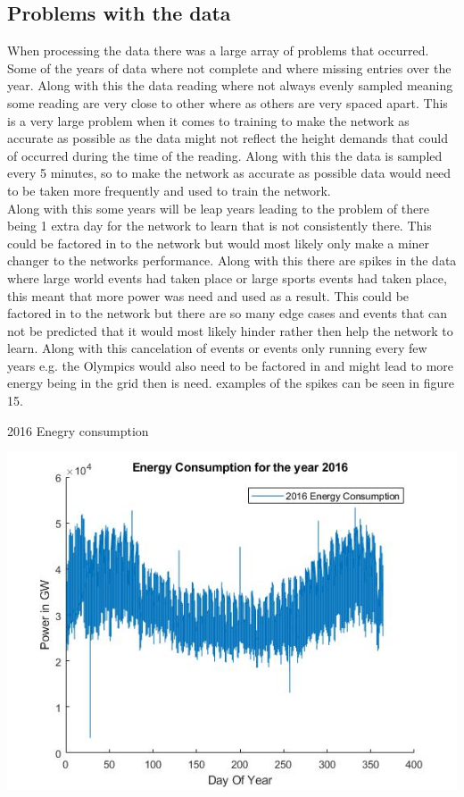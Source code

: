 \documentclass{IEEEtran}[11pt]
\begin{document}
\subsection{Problems with the data}
\begin{flushleft}
  When processing the data there was a large array of problems that occurred. Some of the years of data where not
  complete and where missing entries over the year. Along with this the data reading where not always evenly sampled
  meaning some reading are very close to other where as others are very spaced apart. This is a very large problem when
  it comes to training to make the network as accurate as possible as the data might not reflect the height demands that
  could of occurred during the time of the reading. Along with this the data is sampled every 5 minutes, so to make the
  network as accurate as possible data would need to be taken more frequently and used to train the network.
  \\
  \vspace{1.5mm}
  Along with this some years will be leap years leading to the problem of there being 1 extra day for the network to
  learn that is not consistently there. This could be factored in to the network but would most likely only make a miner
  changer to the networks performance. Along with this there are spikes in the data where large world events had taken
  place or large sports events had taken place, this meant that more power was need and used as a result.
  This could be factored in to the network but there are so many edge cases and events that can not be predicted that
  it would most likely hinder rather then help the network to learn. Along with this cancelation of events or events only
  running every few years e.g. the Olympics would also need to be factored in and might lead to more energy being in the
  grid then is need. examples of the spikes can be seen in figure 15.
  \vspace{1.5mm}
  \begin{center}
    2016 Enegry consumption
  \end{center}
  \vspace{1.5mm}
  \includegraphics[scale = 0.45]{2016datasetplotted}

\end{flushleft}
\end{document}
